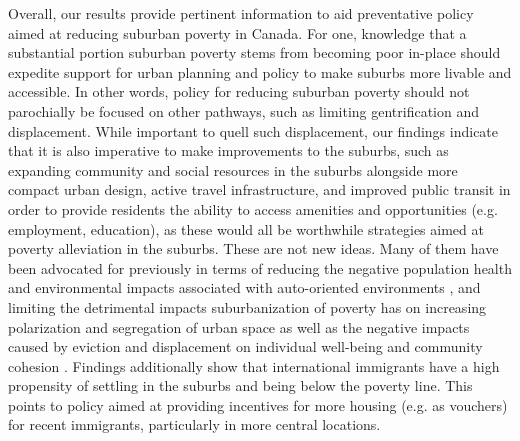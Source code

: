 






Overall, our results provide pertinent information to aid preventative policy aimed at reducing suburban poverty in Canada. For one, knowledge that a substantial portion suburban poverty stems from becoming poor in-place should expedite support for urban planning and policy to make suburbs more livable and accessible. In other words, policy for reducing suburban poverty should not parochially be focused on other pathways, such as limiting gentrification and displacement. While important to quell such displacement, our findings indicate that it is also imperative to make improvements to the suburbs, such as expanding community and social resources in the suburbs alongside more compact urban design, active travel infrastructure, and improved public transit in order to provide residents the ability to access amenities and opportunities (e.g. employment, education), as these would all be worthwhile strategies aimed at poverty alleviation in the suburbs. These are not new ideas. Many of them have been advocated for previously in terms of reducing the negative population health and environmental impacts associated with auto-oriented environments , and limiting the detrimental impacts suburbanization of poverty has on increasing polarization and segregation of urban space as well as the negative impacts caused by eviction and displacement on individual well-being and community cohesion  . Findings additionally show that international immigrants have a high propensity of settling in the suburbs and being below the poverty line. This points to policy aimed at providing incentives for more housing (e.g. as vouchers) for recent immigrants, particularly in more central locations.


